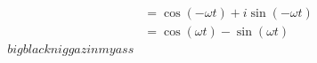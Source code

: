 \documentclass[preview]{standalone}
\begin{document}
\begin{align*}
&=\cos{(-\omega t)}+i\sin{(-\omega t)} \\ &= \cos{(\omega t)}-\sin{(\omega t)} \\ big black niggaz in my ass
\end{align*}
\end{document}
